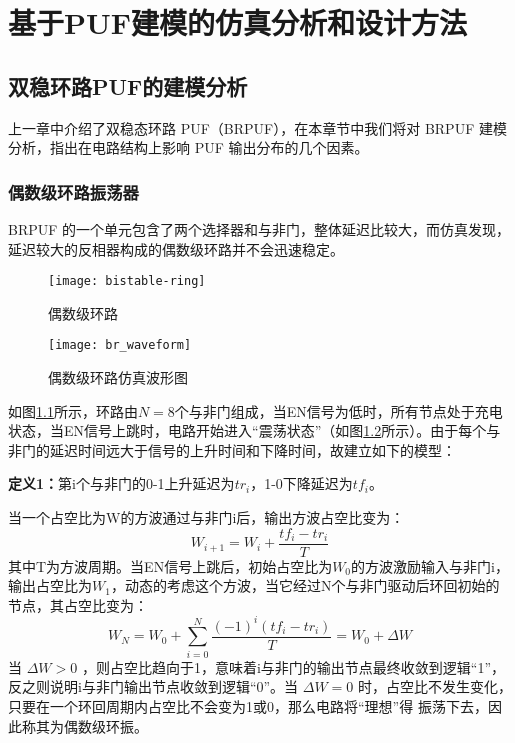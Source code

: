 
\chapter{基于PUF建模的仿真分析和设计方法}\label{chap:buildingmodel}
\section{双稳环路PUF的建模分析}\label{sec:brpufmodel}

上一章中介绍了双稳态环路 PUF（BRPUF），在本章节中我们将对 BRPUF 建模分析，指出在电路结构上影响 PUF 输出分布的几个因素。

\subsection{偶数级环路振荡器}

BRPUF 的一个单元包含了两个选择器和与非门，整体延迟比较大，而仿真发现，延迟较大的反相器构成的偶数级环路并不会迅速稳定。

\begin{figure}[htb!]
\centering
\texttt{[image: bistable-ring]}
\caption{偶数级环路}
\label{fig:bistable-ring}
\end{figure}

\begin{figure}[htb!]
\centering
\texttt{[image: br\_waveform]}
\caption{偶数级环路仿真波形图}
\label{fig:brwaveform}
\end{figure}

如图\ref{fig:bistable-ring}所示，环路由$ N=8 $个与非门组成，当EN信号为低时，所有节点处于充电状态，当EN信号上跳时，电路开始进入``震荡状态''（如图\ref{fig:brwaveform}所示）。由于每个与非门的延迟时间远大于信号的上升时间和下降时间，故建立如下的模型：

\textbf{定义1：}第i个与非门的0-1上升延迟为$ tr_i $，1-0下降延迟为$ tf_i $。

当一个占空比为W的方波通过与非门i后，输出方波占空比变为：
\begin{equation}
W_{i+1}=W_i+\frac{tf_i-tr_i}{T}
\end{equation}
其中T为方波周期。当EN信号上跳后，初始占空比为$ W_0 $的方波激励输入与非门i，输出占空比为$ W_1 $，动态的考虑这个方波，当它经过N个与非门驱动后环回初始的节点，其占空比变为：
\begin{equation}
W_N=W_0+\sum\limits_{i=0}^{N}\frac{(-1)^i(tf_i-tr_i)}{T}=W_0+\Delta W
\end{equation}
当 $ \Delta W>0 $ ，则占空比趋向于1，意味着i与非门的输出节点最终收敛到逻辑``1''，反之则说明i与非门输出节点收敛到逻辑``0''。当 $ \Delta W=0 $ 时，占空比不发生变化，只要在一个环回周期内占空比不会变为1或0，那么电路将``理想''得 振荡下去，因此称其为偶数级环振。

